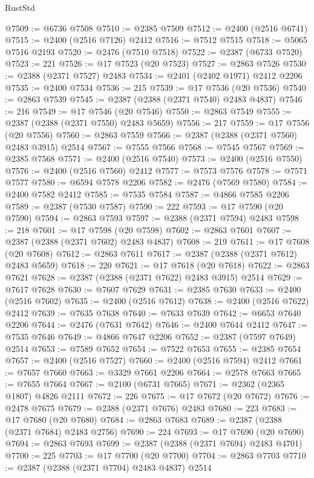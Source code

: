 \begin{lexlean}{RustStd}
\begin{coremodule}
{\begin{coremodule}
{{{{{{{{{{{{{{{{{{{{{{{{{{{{{{{{{{{{{{{{{{{{{{{{{{@7509 := @6736 @7508
@7510 := @2385 @7509
@7512 := @2400 (@2516 @6741)
@7515 := @2400 (@2516 @7126) @2412
@7516 := @7512 @7515
@7518 := @5065 @7516 @2193
@7520 := @2476 (@7510 @7518)
@7522 := @2387 (@6733 @7520)
@7523 := 221
@7526 := @17 @7523 (@20 @7523)
@7527 := @2863 @7526
@7530 := @2388 (@2371 @7527) @2483
@7534 := @2401 (@2402 @1971) @2412 @2206
@7535 := @2400 @7534
@7536 := 215
@7539 := @17 @7536 (@20 @7536)
@7540 := @2863 @7539
@7545 := @2387 (@2388 (@2371 @7540) @2483 @4837)
@7546 := 216
@7549 := @17 @7546 (@20 @7546)
@7550 := @2863 @7549
@7555 := @2387 (@2388 (@2371 @7550) @2483 @5659)
@7556 := 217
@7559 := @17 @7556 (@20 @7556)
@7560 := @2863 @7559
@7566 := @2387 (@2388 (@2371 @7560) @2483 @3915) @2514
@7567 := @7555 @7566
@7568 := @7545 @7567
@7569 := @2385 @7568
@7571 := @2400 (@2516 @7540)
@7573 := @2400 (@2516 @7550)
@7576 := @2400 (@2516 @7560) @2412
@7577 := @7573 @7576
@7578 := @7571 @7577
@7580 := @6594 @7578 @2206
@7582 := @2476 (@7569 @7580)
@7584 := @2400 @7582 @2412
@7585 := @7535 @7584
@7587 := @4866 @7585 @2206
@7589 := @2387 (@7530 @7587)
@7590 := 222
@7593 := @17 @7590 (@20 @7590)
@7594 := @2863 @7593
@7597 := @2388 (@2371 @7594) @2483
@7598 := 218
@7601 := @17 @7598 (@20 @7598)
@7602 := @2863 @7601
@7607 := @2387 (@2388 (@2371 @7602) @2483 @4837)
@7608 := 219
@7611 := @17 @7608 (@20 @7608)
@7612 := @2863 @7611
@7617 := @2387 (@2388 (@2371 @7612) @2483 @5659)
@7618 := 220
@7621 := @17 @7618 (@20 @7618)
@7622 := @2863 @7621
@7628 := @2387 (@2388 (@2371 @7622) @2483 @3915) @2514
@7629 := @7617 @7628
@7630 := @7607 @7629
@7631 := @2385 @7630
@7633 := @2400 (@2516 @7602)
@7635 := @2400 (@2516 @7612)
@7638 := @2400 (@2516 @7622) @2412
@7639 := @7635 @7638
@7640 := @7633 @7639
@7642 := @6653 @7640 @2206
@7644 := @2476 (@7631 @7642)
@7646 := @2400 @7644 @2412
@7647 := @7535 @7646
@7649 := @4866 @7647 @2206
@7652 := @2387 (@7597 @7649) @2514
@7653 := @7589 @7652
@7654 := @7522 @7653
@7655 := @2385 @7654
@7657 := @2400 (@2516 @7527)
@7660 := @2400 (@2516 @7594) @2412
@7661 := @7657 @7660
@7663 := @3329 @7661 @2206
@7664 := @2578 @7663
@7665 := @7655 @7664
@7667 := @2100 (@6731 @7665)
@7671 := @2362 (@2365 @1807) @4826 @2111
@7672 := 226
@7675 := @17 @7672 (@20 @7672)
@7676 := @2478 @7675
@7679 := @2388 (@2371 @7676) @2483
@7680 := 223
@7683 := @17 @7680 (@20 @7680)
@7684 := @2863 @7683
@7689 := @2387 (@2388 (@2371 @7684) @2483 @2756)
@7690 := 224
@7693 := @17 @7690 (@20 @7690)
@7694 := @2863 @7693
@7699 := @2387 (@2388 (@2371 @7694) @2483 @4701)
@7700 := 225
@7703 := @17 @7700 (@20 @7700)
@7704 := @2863 @7703
@7710 := @2387 (@2388 (@2371 @7704) @2483 @4837) @2514
}}}}}}}}}}}}}}}}}}}}}}}}}}}}}}}}}}}}}}}}}}}}}}}}}}
\end{coremodule}}
\end{coremodule}
\end{lexlean}
